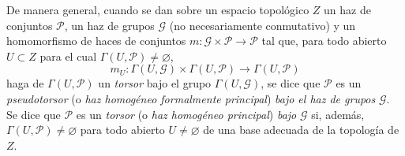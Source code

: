 \begin{env}[16.5.15]
\label{IV.16.5.15}
De manera general, cuando se dan sobre un espacio topológico $Z$ un
haz de conjuntos $\mathscr{P}$, un haz de grupos $\mathscr{G}$ (no
necesariamente conmutativo) y un homomorfismo de haces de conjuntos
$m:\mathscr{G}\times\mathscr{P}\to\mathscr{P}$ tal que, para todo abierto
$U\subset Z$ para el cual $\Gamma(U,\mathscr{P})\neq\varnothing$,
\[
  m_U:\Gamma(U,\mathscr{G})\times\Gamma(U,\mathscr{P})
  \longrightarrow\Gamma(U,\mathscr{P})
\]
haga de $\Gamma(U,\mathscr{P})$ un \emph{torsor} bajo el grupo
$\Gamma(U,\mathscr{G})$, se dice que $\mathscr{P}$ es un
\emph{pseudotorsor} (o \emph{haz homogéneo formalmente principal})
\emph{bajo el haz de grupos} $\mathscr{G}$. Se dice que $\mathscr{P}$ es un
\emph{torsor} (o \emph{haz homogéneo principal}) \emph{bajo} $\mathscr{G}$ si,
además, $\Gamma(U,\mathscr{P})\neq\varnothing$ para todo abierto
$U\neq\varnothing$ de una base adecuada de la topología de $Z$.


\end{env}
